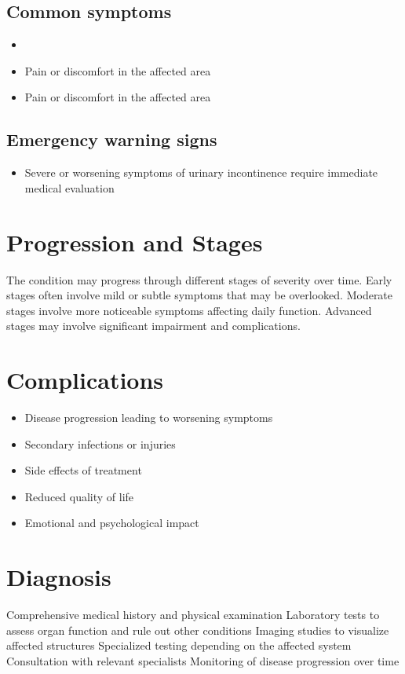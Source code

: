 \subsection{Common symptoms}
\begin{itemize}[noitemsep]
  \item \item Pain or discomfort in the affected area    \item Pain or discomfort in the affected area
  \end{itemize}

\subsection{Emergency warning signs}
\begin{itemize}[noitemsep]
  \item Severe or worsening symptoms of urinary incontinence require immediate medical evaluation
\end{itemize}
\section{Progression and Stages}
The condition may progress through different stages of severity over time. Early stages often involve mild or subtle symptoms that may be overlooked. Moderate stages involve more noticeable symptoms affecting daily function. Advanced stages may involve significant impairment and complications.
\section{Complications}
\begin{itemize}[noitemsep]
  \item Disease progression leading to worsening symptoms
  \item Secondary infections or injuries
  \item Side effects of treatment
  \item Reduced quality of life
  \item Emotional and psychological impact
\end{itemize}
\section{Diagnosis}
Comprehensive medical history and physical examination Laboratory tests to assess organ function and rule out other conditions Imaging studies to visualize affected structures Specialized testing depending on the affected system Consultation with relevant specialists Monitoring of disease progression over time

